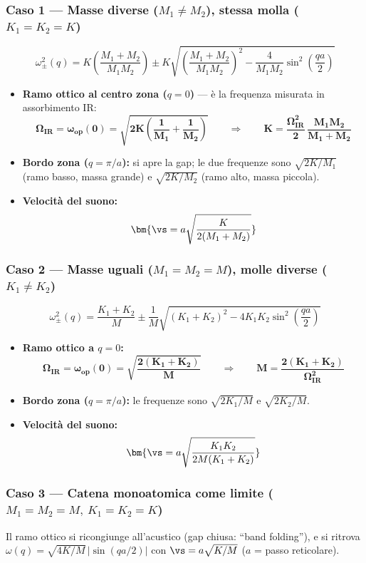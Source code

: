 \subsubsection*{Caso 1 --- Masse diverse ($M_1\neq M_2$), stessa molla ($K_1=K_2=K$)}
\[ \omega^2_{\pm}(q) = K\left(\frac{M_1+M_2}{M_1 M_2}\right) \pm K \sqrt{\left(\frac{M_1+M_2}{M_1 M_2}\right)^2 - \frac{4}{M_1 M_2}\sin^2\!\left(\frac{qa}{2}\right)} \]
\begin{itemize}
  \item \textbf{Ramo ottico al centro zona ($q=0$)} --- è la frequenza misurata in assorbimento IR:
  \[ \bm{\Omega_{IR} = \omega_{op}(0) = \sqrt{2K\left(\frac{1}{M_1}+\frac{1}{M_2}\right)}}
     \qquad\Longrightarrow\qquad \bm{K = \frac{\Omega_{IR}^2}{2}\,\frac{M_1M_2}{M_1+M_2}} \]
  \item \textbf{Bordo zona ($q=\pi/a$):} si apre la gap; le due frequenze sono $\sqrt{2K/M_1}$ (ramo basso, massa grande) e $\sqrt{2K/M_2}$ (ramo alto, massa piccola).
  \item \textbf{Velocità del suono:}
  \[ \bm{\vs = a\sqrt{\frac{K}{2(M_1+M_2)}}} \]
\end{itemize}


\subsubsection*{Caso 2 --- Masse uguali ($M_1=M_2=M$), molle diverse ($K_1\neq K_2$)}
\[ \omega^2_{\pm}(q) = \frac{K_1+K_2}{M} \pm \frac{1}{M}\sqrt{(K_1+K_2)^2 - 4K_1 K_2 \sin^2\!\left(\frac{qa}{2}\right)} \]
\begin{itemize}
  \item \textbf{Ramo ottico a $q=0$:}
  \[ \bm{\Omega_{IR}=\omega_{op}(0) = \sqrt{\frac{2(K_1+K_2)}{M}}} \qquad\Longrightarrow\qquad \bm{M = \frac{2(K_1+K_2)}{\Omega_{IR}^2}} \]
  \item \textbf{Bordo zona ($q=\pi/a$):} le frequenze sono $\sqrt{2K_1/M}$ e $\sqrt{2K_2/M}$.
  \item \textbf{Velocità del suono:}
  \[ \bm{\vs = a\sqrt{\frac{K_1K_2}{2M(K_1+K_2)}}} \]
\end{itemize}

\subsubsection*{Caso 3 --- Catena monoatomica come limite ($M_1=M_2=M,\ K_1=K_2=K$)}
Il ramo ottico si ricongiunge all'acustico (gap chiusa: ``band folding''), e si ritrova
$\omega(q) = \sqrt{4K/M}\,|\sin(qa/2)|$ con $\vs=a\sqrt{K/M}$ ($a$ = passo reticolare).


